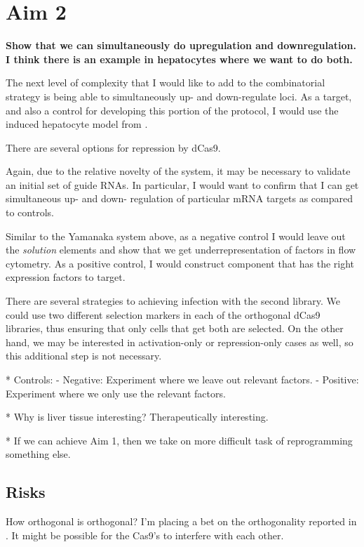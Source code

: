 \documentclass[10pt]{article}
\begin{document}
\section*{Aim 2}

\textbf{Show that we can simultaneously do upregulation and downregulation. I think there is an example in hepatocytes where we want to do both.}

The next level of complexity that I would like to add to the combinatorial strategy is being able to simultaneously up- and down-regulate loci. As a target, and also a control for developing this portion of the protocol, I would use the induced hepatocyte model from \cite{morris2014dissecting}.

There are several options for repression by dCas9.

Again, due to the relative novelty of the system, it may be necessary to validate an initial set of guide RNAs. In particular, I would want to confirm that I can get simultaneous up- and down- regulation of particular mRNA targets as compared to controls.

Similar to the Yamanaka system above, as a negative control I would leave out the \textit{solution} elements and show that we get underrepresentation of factors in flow cytometry. As a positive control, I would construct component that has the right expression factors to target.

There are several strategies to achieving infection with the second library. We could use two different selection markers in each of the orthogonal dCas9 libraries, thus ensuring that only cells that get both are selected. On the other hand, we may be interested in activation-only or repression-only cases as well, so this additional step is not necessary.

* Controls:
    - Negative: Experiment where we leave out relevant factors.
    - Positive: Experiment where we only use the relevant factors.

* Why is liver tissue interesting? Therapeutically interesting.

* If we can achieve Aim 1, then we take on more difficult task of reprogramming something else.

\subsection*{Risks}

How orthogonal is orthogonal? I'm placing a bet on the orthogonality reported in \cite{esvelt2013orthogonal}. It might be possible for the Cas9's to interfere with each other.
\end{document}
